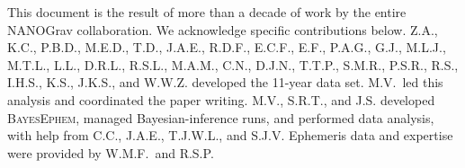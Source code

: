 This document is the result of more than a decade of work by the entire NANOGrav collaboration.
We acknowledge specific contributions below.
Z.A., K.C., P.B.D., M.E.D., T.D., J.A.E., R.D.F., E.C.F., E.F., P.A.G., G.J., M.L.J., M.T.L., L.L., D.R.L., R.S.L., M.A.M., C.N., D.J.N., T.T.P., S.M.R., P.S.R., R.S., I.H.S., K.S., J.K.S., and W.W.Z. developed the 11-year data set.
M.V.\ led this analysis and coordinated the paper writing.
M.V., S.R.T., and J.S. developed \textsc{BayesEphem}, managed Bayesian-inference runs, and performed data analysis, with help from C.C., J.A.E., T.J.W.L., and S.J.V. Ephemeris data and expertise were provided by W.M.F.\ and R.S.P.
